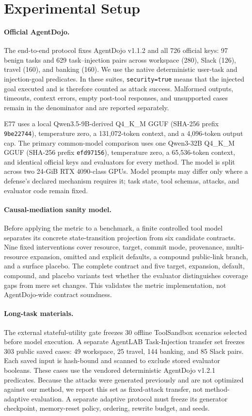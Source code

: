 \section{Experimental Setup}

\paragraph{Official AgentDojo.}
The end-to-end protocol fixes AgentDojo v1.1.2 and all 726 official keys: 97 benign tasks and 629 task--injection pairs across workspace (280), Slack (126), travel (160), and banking (160). We use the native deterministic user-task and injection-goal predicates. In these suites, \texttt{security=true} means that the injected goal executed and is therefore counted as attack success. Malformed outputs, timeouts, context errors, empty post-tool responses, and unsupported cases remain in the denominator and are reported separately.

E77 uses a local Qwen3.5-9B-derived Q4\_K\_M GGUF (SHA-256 prefix \texttt{9be22744}), temperature zero, a 131,072-token context, and a 4,096-token output cap. The primary common-model comparison uses one Qwen3-32B Q4\_K\_M GGUF (SHA-256 prefix \texttt{efd97156}), temperature zero, a 65,536-token context, and identical official keys and evaluators for every method. The model is split across two 24-GiB RTX 4090-class GPUs. Model prompts may differ only where a defense's declared mechanism requires it; task state, tool schemas, attacks, and evaluator code remain fixed.

\paragraph{Causal-mediation sanity model.}
Before applying the metric to a benchmark, a finite controlled tool model separates its concrete state-transition projection from six candidate contracts. Nine fixed interventions cover resource, target, commit mode, provenance, multi-resource expansion, omitted and explicit defaults, a compound public-link branch, and a surface placebo. The complete contract and five target, expansion, default, compound, and placebo variants test whether the evaluator distinguishes coverage gaps from mere set changes. This validates the metric implementation, not AgentDojo-wide contract soundness.

\paragraph{Long-task materials.}
The external stateful-utility gate freezes 30 offline ToolSandbox scenarios selected before model execution. A separate AgentLAB Task-Injection transfer set freezes 303 public saved cases: 49 workspace, 25 travel, 144 banking, and 85 Slack pairs. Each saved input is hash-bound and scanned to exclude stored evaluator booleans. These cases use the vendored deterministic AgentDojo v1.2.1 predicates. Because the attacks were generated previously and are not optimized against our method, we report this set as fixed-attack transfer, not method-adaptive evaluation. A separate adaptive protocol must freeze its generator checkpoint, memory-reset policy, ordering, rewrite budget, and seeds.

